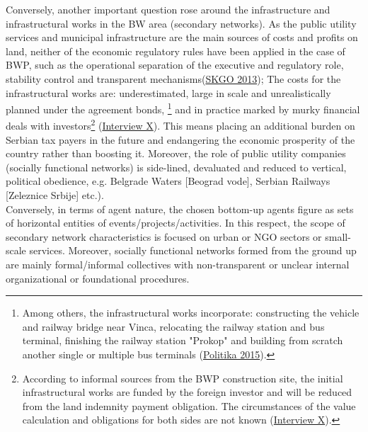 \documentclass[11pt]{report}
\begin{document}
{{{{Conversely, another important question rose around the infrastructure and infrastructural works in the BW area (secondary networks).
As the public utility services and municipal infrastructure are the main sources of costs and profits on land, neither of the economic regulatory rules have been applied in the case of BWP, such as the operational separation of the executive and regulatory role, stability control and transparent mechanisms(\href{SKGO}{SKGO 2013});
The costs for the infrastructural works are: underestimated, large in scale and unrealistically planned under the agreement bonds,
\footnote{Among others, the infrastructural works incorporate: constructing the vehicle and railway bridge near Vinca, relocating the railway station and bus terminal, finishing the railway station "Prokop" and building from scratch another single or multiple bus terminals (\href{Politike}{Politika 2015}).}
and in practice marked by murky financial deals with investors\footnote{According to informal sources from the BWP construction site, the initial infrastructural works are funded by the foreign investor and will be reduced from the land indemnity payment obligation. The circumstances of the value calculation and obligations for both sides are not known (\href{InterviewX}{Interview X}).} 
(\href{InterviewX}{Interview X}).
This means placing an additional burden on Serbian tax payers in the future and endangering the economic prosperity of the country rather than boosting it.
Moreover, the role of public utility companies (socially functional networks) is side-lined, devaluated and reduced to vertical, political obedience, e.g. Belgrade Waters [Beograd vode], Serbian Railways [Zeleznice Srbije] etc.).
\\

Conversely, in terms of agent nature, the chosen bottom-up agents figure as sets of horizontal entities of events/projects/activities. In this respect, the scope of secondary network characteristics is focused on urban or NGO sectors or small-scale services.
Moreover, socially functional networks formed from the ground up are mainly formal/informal collectives with non-transparent or unclear internal organizational or foundational procedures.
\\

}}}}
\end{document}
